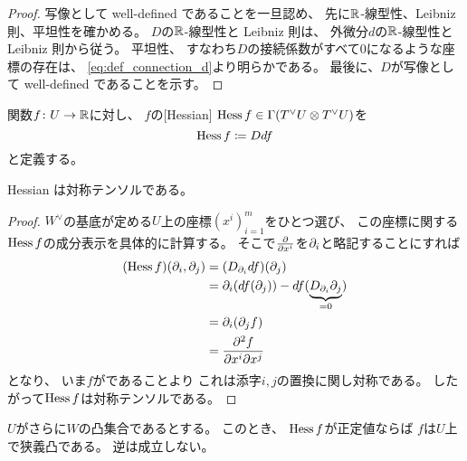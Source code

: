 \documentclass[report]{jlreq}
\begin{document}
\begin{proof}
    写像として well-defined であることを一旦認め、
    先に$\mathbb{R}$-線型性、Leibniz 則、平坦性を確かめる。
    $D$の$\mathbb{R}$-線型性と Leibniz 則は、
    外微分$d$の$\mathbb{R}$-線型性と Leibniz 則から従う。
    平坦性、
    すなわち$D$の接続係数がすべて$0$になるような座標の存在は、
    \cref{eq:def_connection_d}より明らかである。
    最後に、$D$が写像として well-defined であることを示す。
\end{proof}


\begin{definition}[Hessian]
    \smooth 関数$f \colon U \to \mathbb{R}$に対し、
    $f$の[Hessian]
    $\operatorname{Hess} f \in \Gamma(T^\vee U \otimes T^\vee U)$を
    \begin{equation}
        \operatorname{Hess} f \coloneqq Ddf
    \end{equation}
    と定義する。
\end{definition}

\begin{proposition}
    Hessian は対称テンソルである。
\end{proposition}

\begin{proof}
    $W^\vee$の基底が定める$U$上の座標$(x^i)_{i = 1}^m$をひとつ選び、
    この座標に関する$\operatorname{Hess} f$の成分表示を具体的に計算する。
    そこで$\deldel{x^i}$を$\partial_i$と略記することにすれば
    \begin{alignat}{1}
        (\operatorname{Hess} f)(\partial_i, \partial_j)
            &= (D_{\partial_i} df)(\partial_j) \\
            &= \partial_i (df(\partial_j)) - df(\underbrace{D_{\partial_i} \partial_j}_{= 0}) \\
            &= \partial_i (\partial_j f) \\
            &= \frac{\partial^2 f}{\partial x^i \partial x^j}
    \end{alignat}
    となり、
    いま$f$が\smooth であることより
    これは添字$i, j$の置換に関し対称である。
    したがって$\operatorname{Hess} f$は対称テンソルである。
\end{proof}

\begin{proposition}
    $U$がさらに$W$の凸集合であるとする。
    このとき、
    $\operatorname{Hess} f$が正定値ならば
    $f$は$U$上で狭義凸である。
    逆は成立しない。
\end{proposition}
\end{document}
